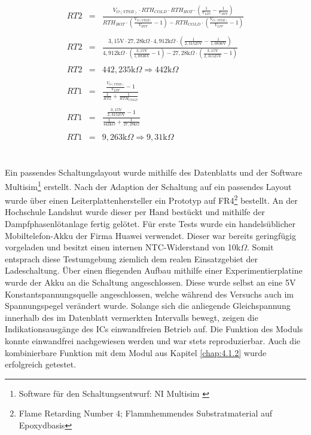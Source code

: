 \documentclass[12pt]{scrreprt} %
\begin{document}
\begin{eqnarray}
RT2&=&\frac{V_{O(VTSB)} \cdot RTH_{COLD} \cdot RTH_{HOT} \cdot \left( \frac{1}{V_{LTF}}-\frac{1}{V_{HTF}}\right)}{RTH_{HOT} \cdot \left( \frac{V_{O(VTSB)}}{V_{HTF}}-1\right)-RTH_{COLD} \cdot \left( \frac{V_{O(VTSB)}}{V_{LTF}}-1 \right)}\\
\nonumber\\
RT2&=&\frac{3,15\text{V} \cdot 27,28\text{k}\Omega \cdot4,912\text{k}\Omega \cdot \left( \frac{1}{2,31525\text{V}}-\frac{1}{1,0836\text{V}}\right)}{4,912\text{k}\Omega \cdot \left( \frac{3,15\text{V}}{1,0836\text{V}}-1\right)-27,28\text{k}\Omega \cdot \left( \frac{3,15\text{V}}{2,31525\text{V}}-1 \right)}\\
\nonumber\\
RT2&=& 442,235 \text{k} \Omega \Rightarrow 442\text{k} \Omega\\
\nonumber\\
RT1&=&\frac{\frac{V_{O(VTSB)}}{V_{LTF}}-1}{\frac{1}{RT2}+\frac{1}{RTH_{COLD}}}\\
\nonumber\\
RT1&=&\frac{\frac{3,15\text{V}}{2,31525\text{V}}-1}{\frac{1}{442\text{k} \Omega}+\frac{1}{27,28\text{k}\Omega}}\\
\nonumber\\
RT1&=&9,263\text{k}\Omega \Rightarrow 9,31\text{k}\Omega
\end{eqnarray}
\\
\\
Ein passendes Schaltungslayout wurde mithilfe des Datenblatts \citep{BQ24100} und der Software Multisim\footnote{Software für den Schaltungsentwurf: NI Multisim \citep{MULTI}} erstellt. Nach der Adaption der Schaltung auf ein passendes Layout wurde über einen Leiterplattenhersteller ein Prototyp auf FR4\footnote{Flame Retarding Number 4; Flammhemmendes Substratmaterial auf Epoxydbasis} bestellt. An der Hochschule Landshut wurde dieser per Hand bestückt und mithilfe der Dampfphasenlötanlage fertig gelötet. Für erste Tests wurde ein handelsüblicher Mobiltelefon-Akku der Firma Huawei verwendet. Dieser war bereits geringfügig vorgeladen und besitzt einen internen NTC-Widerstand von 10k$\Omega$. Somit entsprach diese Testumgebung ziemlich dem realen Einsatzgebiet der Ladeschaltung. Über einen fliegenden Aufbau mithilfe einer Experimentierplatine wurde der Akku an die Schaltung angeschlossen. Diese wurde selbst an eine 5V Konstantspannungsquelle angeschlossen, welche während des Versuchs auch im Spannungspegel verändert wurde. Solange sich die anliegende Gleichspannung innerhalb des im Datenblatt vermerkten Intervalls bewegt, zeigen die Indikationsausgänge des ICs einwandfreien Betrieb auf. Die Funktion des Moduls konnte einwandfrei nachgewiesen werden und war stets reproduzierbar. Auch die kombinierbare Funktion mit dem Modul aus Kapitel \vref{chap:4.1.2} wurde erfolgreich getestet.
\end{document}
